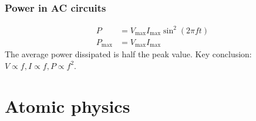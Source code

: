 \subsubsection*{Power in AC circuits}
$$\begin{aligned}P&=V_\text{max}I_\text{max}\sin^2(2\pi ft)\\P_\text{max}&=V_\text{max}I_\text{max}\end{aligned}$$
The average power dissipated is half the peak value. Key conclusion: $V\propto f, I\propto f, P\propto f^2$.
\newpage

\section{Atomic physics}

